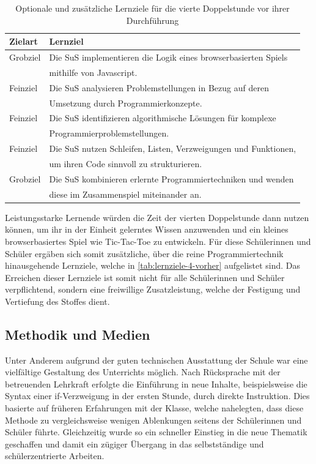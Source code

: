 \begin{table}[h!]
	\begin{tabular*}{\linewidth}{l|l}
		\hline
		\textbf{Zielart} & \textbf{Lernziel}\\
		\hline \hline
		Grobziel & Die SuS implementieren die Logik eines browserbasierten Spiels\\
		& mithilfe von Javascript.\\
		Feinziel & Die SuS analysieren Problemstellungen in Bezug auf deren\\
		& Umsetzung durch Programmierkonzepte.\\
		Feinziel & Die SuS identifizieren algorithmische Lösungen für komplexe\\
		& Programmierproblemstellungen.\\
		Feinziel & Die SuS nutzen Schleifen, Listen, Verzweigungen und Funktionen,\\
		& um ihren Code sinnvoll zu strukturieren.\\
		Grobziel & Die SuS kombinieren erlernte Programmiertechniken und wenden\\
		& diese im Zusammenspiel miteinander an.\\
		\hline
	\end{tabular*}
	\caption{Optionale und zusätzliche Lernziele für die vierte Doppelstunde vor ihrer Durchführung}
	\label{tab:lernziele-4-vorher}
\end{table}

Leistungsstarke Lernende würden die Zeit der vierten Doppelstunde dann nutzen können, um ihr in der Einheit gelerntes Wissen anzuwenden und ein kleines browserbasiertes Spiel wie Tic-Tac-Toe zu entwickeln.
Für diese Schülerinnen und Schüler ergäben sich somit zusätzliche, über die reine Programmiertechnik hinausgehende Lernziele, welche in \autoref{tab:lernziele-4-vorher} aufgelistet sind.
Das Erreichen dieser Lernziele ist somit nicht für alle Schülerinnen und Schüler verpflichtend, sondern eine freiwillige Zusatzleistung, welche der Festigung und Vertiefung des Stoffes dient.


\subsection{Methodik und Medien}
\label{subsec:methodik-medien}

Unter Anderem aufgrund der guten technischen Ausstattung der Schule war eine vielfältige Gestaltung des Unterrichts möglich.
Nach Rücksprache mit der betreuenden Lehrkraft erfolgte die Einführung in neue Inhalte, beispielsweise die Syntax einer if-Verzweigung in der ersten Stunde, durch direkte Instruktion.
Dies basierte auf früheren Erfahrungen mit der Klasse, welche nahelegten, dass diese Methode zu vergleichsweise wenigen Ablenkungen seitens der Schülerinnen und Schüler führte.
Gleichzeitig wurde so ein schneller Einstieg in die neue Thematik geschaffen und damit ein zügiger Übergang in das selbstständige und schülerzentrierte Arbeiten.

